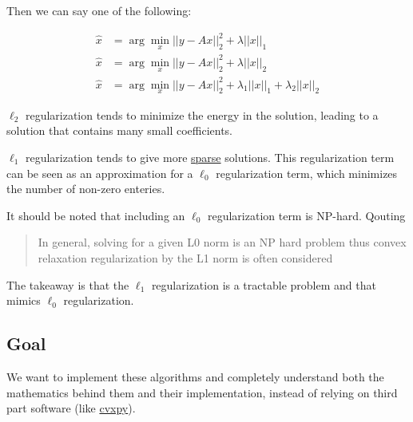 \documentclass{article}
\newcommand{\cvxpy}{http://www.cvxpy.org/en/latest/}
\newcommand{\sparse}{https://en.wikipedia.org/wiki/Sparse_matrix}
\begin{document}
Then we can say one of the following:

$$\begin{aligned}
\widehat{x} &= \arg \min_x ||y - Ax||_2^2 + \lambda||x||_1\\
\widehat{x} &= \arg \min_x ||y - Ax||_2^2 + \lambda||x||_2\\
\widehat{x} &= \arg \min_x ||y - Ax||_2^2 + \lambda_1 ||x||_1 + \lambda_2||x||_2
\end{aligned}$$

$\ell_2$ regularization tends to minimize the energy in the solution, leading to a solution that contains many small coefficients.

$\ell_1$ regularization tends to give more \href{\sparse}{sparse} solutions. This regularization term can be seen as an approximation for a $\ell_0$ regularization term, which minimizes the number of non-zero enteries.

It should be noted that including an $\ell_0$ regularization term is NP-hard. Qouting \cite{Mørup_approximatel0}

\begin{quote}
In general, solving for a given L0 norm is an NP hard problem thus convex relaxation regularization by the L1 norm is often considered
\end{quote}

The takeaway is that the $\ell_1$ regularization is a tractable problem and that mimics $\ell_0$ regularization.

\subsection{Goal}
We want to implement these algorithms and completely understand both the mathematics behind them and their implementation, instead of relying on third part software (like \href{\cvxpy}{cvxpy}).



\end{document}
